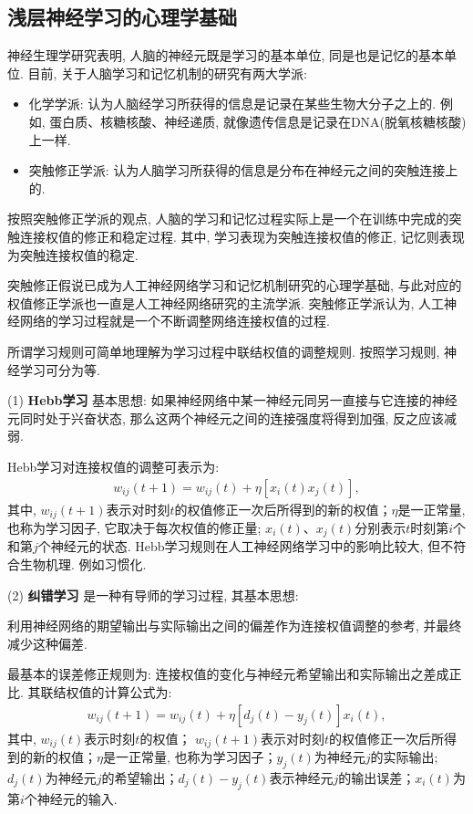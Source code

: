\subsection{浅层神经学习的心理学基础}

神经生理学研究表明, 人脑的神经元既是学习的基本单位, 同是也是记忆的基本单位. 目前, 关于人脑学习和记忆机制的研究有两大学派:
\begin{itemize}
\item 化学学派: 认为人脑经学习所获得的信息是记录在某些生物大分子之上的. 例如, 蛋白质、核糖核酸、神经递质, 就像遗传信息是记录在DNA(脱氧核糖核酸)上一样.
\item 突触修正学派: 认为人脑学习所获得的信息是分布在神经元之间的突触连接上的.
\end{itemize}
按照突触修正学派的观点, 人脑的学习和记忆过程实际上是一个在训练中完成的突触连接权值的修正和稳定过程. 其中, 学习表现为突触连接权值的修正, 记忆则表现为突触连接权值的稳定.

突触修正假说已成为人工神经网络学习和记忆机制研究的心理学基础, 与此对应的权值修正学派也一直是人工神经网络研究的主流学派.
突触修正学派认为, 人工神经网络的学习过程就是一个不断调整网络连接权值的过程.

所谓学习规则可简单地理解为学习过程中联结权值的调整规则. 按照学习规则, 神经学习可分为等.

    (1) \textbf{Hebb学习} 基本思想: 如果神经网络中某一神经元同另一直接与它连接的神经元同时处于兴奋状态, 那么这两个神经元之间的连接强度将得到加强, 反之应该减弱.

Hebb学习对连接权值的调整可表示为:
\begin{align}
  w_{i j}(t+1)=w_{i j}(t)+\eta\left[x_{i}(t) x_{j}(t)\right],
\end{align}
其中, $w_{ij}(t+1)$表示对时刻$t$的权值修正一次后所得到的新的权值；$\eta$是一正常量, 也称为学习因子, 它取决于每次权值的修正量;
$x_i(t)$、$x_j(t)$分别表示$t$时刻第$i$个和第$j$个神经元的状态.
Hebb学习规则在人工神经网络学习中的影响比较大, 但不符合生物机理. 例如习惯化.

  (2) \textbf{纠错学习} 是一种有导师的学习过程, 其基本思想:

利用神经网络的期望输出与实际输出之间的偏差作为连接权值调整的参考, 并最终减少这种偏差.

最基本的误差修正规则为: 连接权值的变化与神经元希望输出和实际输出之差成正比. 其联结权值的计算公式为:
\begin{align}
  w_{i j}(t+1)=w_{i j}(t)+\eta\left[d_{j}(t)-y_{j}(t)\right] x_{i}(t),
\end{align}
其中,  $w_{ij}(t)$表示时刻$t$的权值； $w_{ij}(t+1)$表示对时刻$t$的权值修正一次后所得到的新的权值；$\eta$是一正常量, 也称为学习因子；$y_j(t)$为神经元$j$的实际输出; $d_j(t)$为神经元$j$的希望输出；$d_j(t)-y_j(t)$表示神经元$j$的输出误差；$x_i(t)$为第$i$个神经元的输入.

